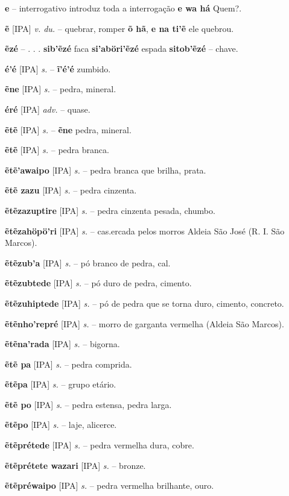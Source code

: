 \textbf{e} -- interrogativo  introduz toda a interrogação  \textbf{e wa há} Quem?.

\textbf{ẽ} [IPA] \textit{v. du.} -- quebrar, romper  \textbf{õ hã}, \textbf{e na ti'ẽ} ele quebrou.

\textbf{ẽzé} -- . . .  \textbf{sib'ẽzé} faca  \textbf{si'aböri'ẽzé} espada  \textbf{sitob'ẽzé} -- chave.

\textbf{é'é} [IPA] \textit{s.} -- \textbf{ĩ'é'é} zumbido.

\textbf{ẽne} [IPA] \textit{s.} -- pedra, mineral.

\textbf{éré} [IPA] \textit{adv.} -- quase.

\textbf{ẽtẽ} [IPA] \textit{s.} -- \textbf{ẽne} pedra, mineral.

\textbf{ẽtẽ} [IPA] \textit{s.} -- pedra branca.

\textbf{ẽtẽ'awaipo} [IPA] \textit{s.} -- pedra branca que brilha, prata.

\textbf{ẽtẽ zazu} [IPA] \textit{s.} -- pedra cinzenta.

\textbf{ẽtẽzazuptire} [IPA] \textit{s.} -- pedra cinzenta pesada, chumbo.

\textbf{ẽtẽzahöpö'ri} [IPA] \textit{s.} -- cas.ercada pelos morros  Aldeia São José (R. I. São Marcos).

\textbf{ẽtẽzub'a} [IPA] \textit{s.} -- pó branco de pedra, cal.

\textbf{ẽtẽzubtede} [IPA] \textit{s.} -- pó duro de pedra, cimento.

\textbf{ẽtẽzuhiptede} [IPA] \textit{s.} -- pó de pedra que se torna duro, cimento, concreto.

\textbf{ẽtẽnho'repré} [IPA] \textit{s.} -- morro de garganta vermelha (Aldeia São Marcos).

\textbf{ẽtẽna'rada} [IPA] \textit{s.} -- bigorna.

\textbf{ẽtẽ pa} [IPA] \textit{s.} -- pedra comprida.

\textbf{ẽtẽpa} [IPA] \textit{s.} -- grupo etário.

\textbf{ẽtẽ po} [IPA] \textit{s.} -- pedra estensa, pedra larga.

\textbf{ẽtẽpo} [IPA] \textit{s.} -- laje, alicerce.

\textbf{ẽtẽprétede} [IPA] \textit{s.} -- pedra vermelha dura, cobre.

\textbf{ẽtẽprétete wazari} [IPA] \textit{s.} -- bronze.

\textbf{ẽtẽpréwaipo} [IPA] \textit{s.} -- pedra vermelha brilhante, ouro.

